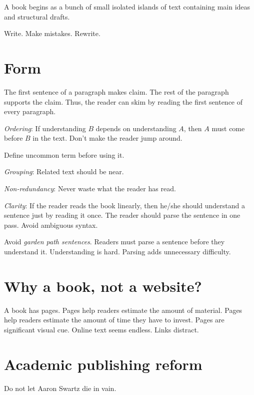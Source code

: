 A book begins as a bunch of small isolated islands of text containing main ideas and structural drafts.

Write.
Make mistakes.
Rewrite.

\section{Form}

The first sentence of a paragraph makes claim.
The rest of the paragraph supports the claim.
Thus, the reader can skim by reading the first sentence of every paragraph.

\emph{Ordering}:
If understanding \(B\) depends on understanding \(A\),
then \(A\) must come before \(B\) in the text.
Don't make the reader jump around.

Define uncommon term before using it.

\emph{Grouping}:
Related text should be near.

\emph{Non-redundancy}:
Never waste what the reader has read.

\emph{Clarity}:
If the reader reads the book linearly,
then he/she should understand a sentence just by reading it once.
The reader should parse the sentence in one pass.
Avoid ambiguous syntax.

Avoid \emph{garden path sentences}.
Readers must parse a sentence before they understand it.
Understanding is hard.
Parsing adds unnecessary difficulty.

\section{Why a book, not a website?}

A book has pages.
Pages help readers estimate the amount of material.
Pages help readers estimate the amount of time they have to invest.
Pages are significant visual cue.
Online text seems endless.
Links distract.

\section{Academic publishing reform}

Do not let Aaron Swartz die in vain.


